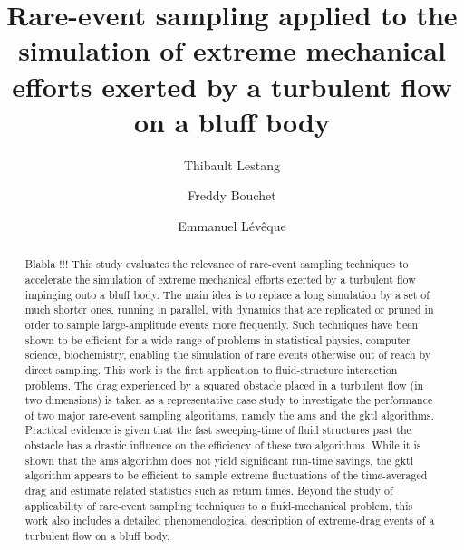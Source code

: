 \documentclass[pre,aps,floatfix,10pt,superscriptaddress, notitlepage,preprint]{revtex4-1}
\begin{document}
	
\title{Rare-event sampling applied to the simulation of extreme mechanical efforts exerted by a turbulent flow on a bluff body}

\author{Thibault Lestang}
\author{Freddy Bouchet}
\author{Emmanuel Lévêque}
	
	
	
\begin{abstract}
Blabla !!! This study evaluates the relevance of rare-event sampling techniques to accelerate the simulation of extreme mechanical efforts exerted by a turbulent flow impinging onto a bluff body.
The main idea is to replace a long simulation by a set of much shorter ones, running in parallel, with dynamics that are replicated or pruned in order to sample large-amplitude events more frequently. 
%
Such techniques have been shown to be efficient for a wide range of problems in statistical physics, computer science, biochemistry, enabling the simulation of rare  events otherwise out of reach by direct sampling.
This work is the first application to fluid-structure interaction problems. 
%
The drag experienced by a squared obstacle placed in a turbulent flow (in two dimensions) is taken as a representative case study to investigate the performance of two major rare-event sampling algorithms, namely the \ac{ams} and the \ac{gktl} algorithms.
Practical evidence is given that the fast sweeping-time of fluid structures past the obstacle has a drastic influence on the efficiency of these two algorithms.
While it is shown that the \ac{ams} algorithm does not yield significant run-time savings, the \ac{gktl} algorithm appears to be efficient to sample extreme fluctuations of the time-averaged drag and estimate related statistics such as return times. 
%
Beyond the study of applicability of rare-event sampling techniques to a fluid-mechanical problem, this work also includes a detailed phenomenological description of extreme-drag events of a turbulent flow on a bluff body. 
\end{abstract}
	
\end{document}
